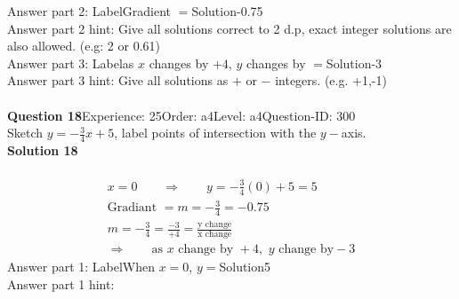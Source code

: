\documentclass{article}
\begin{document}
Answer part 2: \hspace{10pt}Label\hspace{10pt}Gradient $=$\hspace{10pt}Solution\hspace{10pt}-0.75\\
Answer part 2 hint: \hspace{15pt}Give all solutions correct to 2 d.p, exact integer solutions are also allowed. (e.g: 2 or 0.61)\\
Answer part 3: \hspace{10pt}Label\hspace{10pt}as $x$ changes by $+4$, $y$ changes by $=$\hspace{10pt}Solution\hspace{10pt}-3\\
Answer part 3 hint: \hspace{15pt}Give all solutions as $+$ or $-$ integers. (e.g. +1,-1)\\
\\[4pt]
\noindent\textbf{Question 18}\hspace{20pt}Experience: 25\hspace{20pt}Order: a4\hspace{20pt}Level: a4\hspace{20pt}Question-ID: 300\\[2pt]
Sketch $y=-\displaystyle\frac{3}{4}x+5$, label points of intersection with the $y-$axis.\\[4pt]
\noindent\textbf{Solution 18}\\[2pt]
\\[-35pt]\begin{align*}
&x=0\qquad\Rightarrow\qquad y=-\displaystyle\frac{3}{4}(0)+5=5&\\[2pt]
&\text{Gradiant}\,\,=m=-\displaystyle\frac{3}{4}=-0.75&\\[2pt]
&m=-\displaystyle\frac{3}{4}=\displaystyle\frac{-3}{+4}=\displaystyle\frac{\text{y change}}{\text{x change}}&\\[2pt]
& \Rightarrow\qquad \text{as}\,\, x \,\,\text{change by } +4,\,\, y\,\, \text{change by} -3 &
\end{align*}
Answer part 1: \hspace{10pt}Label\hspace{10pt}When $x=0$, $y=$\hspace{10pt}Solution\hspace{10pt}5\\
Answer part 1 hint: \hspace{15pt}\\
\end{document}
